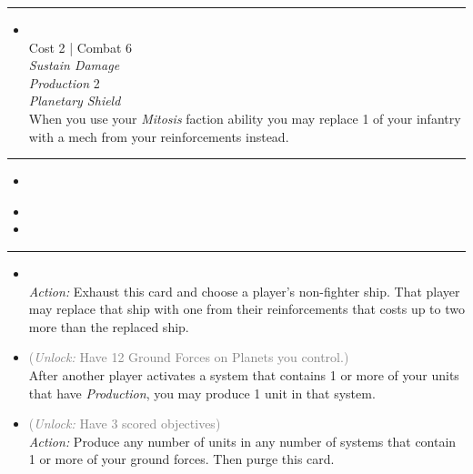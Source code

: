 \begin{multicols}{2}
\vspace{-10pt}\rule{\hsize}{0.4pt}\vspace{5pt}


\begin{itemize}
\item {}
\\
Cost 2 | Combat 6 \\
\emph{Sustain Damage}\\
\emph{Production} 2\\
\emph{Planetary Shield}\\
When you use your \emph{Mitosis}
faction ability you may replace 1 of your infantry with a mech from your reinforcements instead. 
\end{itemize}

\vspace{-10pt}\rule{\hsize}{0.4pt}\vspace{5pt}


\begin{itemize}
\item {}
\end{itemize}

\columnbreak
{}

\begin{itemize}
\item {}
\item \bioplasmosis
\end{itemize}

\vspace{-10pt}\rule{\hsize}{0.4pt}\vspace{5pt}


\begin{itemize}
\item {}\\
\emph{Action:}
Exhaust this card and choose a player's non-fighter ship. That player may replace that ship with one from their reinforcements that costs up to two more than the replaced ship.
\item {} \textcolor{gray}{(\emph{Unlock:} Have 12 Ground Forces on Planets you control.)}\\
After another player activates a system that contains 1 or more of your units that have \emph{Production},
you may produce 1 unit in that system.
\item {} \textcolor{gray}{(\emph{Unlock:} Have 3 scored objectives)}\\
\emph{Action:} Produce any number of units in any number of systems that contain 1 or more of your ground forces. Then purge this card.
\end{itemize}


\end{multicols}
